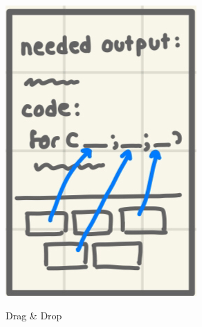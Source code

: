 \begin{figure}[!htbp]
\begin{subfigure}[b]{0.2\linewidth}
			\includegraphics[width=\textwidth]{Ex1.png}\\
			\caption{Drag \& Drop}
		\end{subfigure}
		\hspace{1em}
		\begin{subfigure}[b]{0.2\linewidth}

\end{subfigure}
\end{figure}
